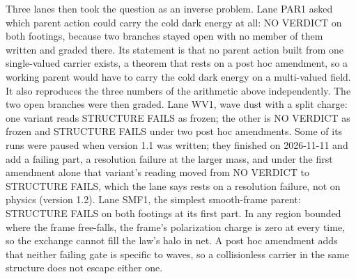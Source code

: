 \documentclass[10pt]{article}
\begin{document}
Three lanes then took the question as an inverse problem. Lane PAR1 asked which parent action could carry the cold dark energy at all: NO VERDICT on both footings, because two branches stayed open with no member of them written and graded there. Its statement is that no parent action built from one single-valued carrier exists, a theorem that rests on a post hoc amendment, so a working parent would have to carry the cold dark energy on a multi-valued field. It also reproduces the three numbers of the arithmetic above independently. The two open branches were then graded. Lane WV1, wave dust with a split charge: one variant reads STRUCTURE FAILS as frozen; the other is NO VERDICT as frozen and STRUCTURE FAILS under two post hoc amendments. Some of its runs were paused when version 1.1 was written; they finished on 2026-11-11 and add a failing part, a resolution failure at the larger mass, and under the first amendment alone that variant's reading moved from NO VERDICT to STRUCTURE FAILS, which the lane says rests on a resolution failure, not on physics (version 1.2). Lane SMF1, the simplest smooth-frame parent: STRUCTURE FAILS on both footings at its first part. In any region bounded where the frame free-falls, the frame's polarization charge is zero at every time, so the exchange cannot fill the law's halo in net. A post hoc amendment adds that neither failing gate is specific to waves, so a collisionless carrier in the same structure does not escape either one.
\end{document}
